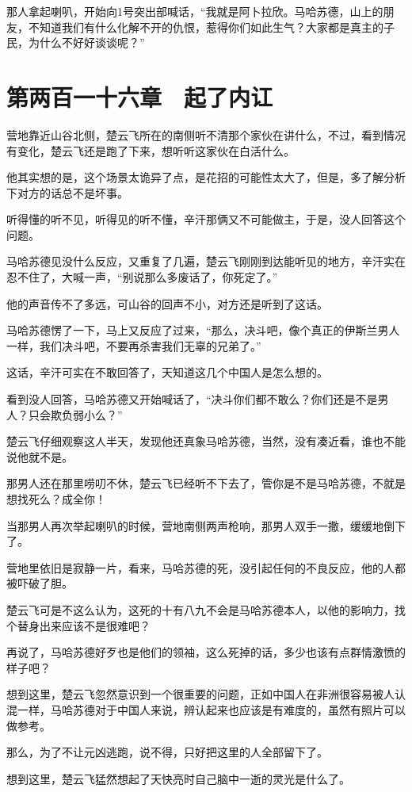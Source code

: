 那人拿起喇叭，开始向1号突出部喊话，“我就是阿卜拉欣。马哈苏德，山上的朋友，不知道我们有什么化解不开的仇恨，惹得你们如此生气？大家都是真主的子民，为什么不好好谈谈呢？”

\section{第两百一十六章　起了内讧}

营地靠近山谷北侧，楚云飞所在的南侧听不清那个家伙在讲什么，不过，看到情况有变化，楚云飞还是跑了下来，想听听这家伙在白活什么。

他其实想的是，这个场景太诡异了点，是花招的可能性太大了，但是，多了解分析下对方的话总不是坏事。

听得懂的听不见，听得见的听不懂，辛汗那俩又不可能做主，于是，没人回答这个问题。

马哈苏德见没什么反应，又重复了几遍，楚云飞刚刚到达能听见的地方，辛汗实在忍不住了，大喊一声，“别说那么多废话了，你死定了。”

他的声音传不了多远，可山谷的回声不小，对方还是听到了这话。

马哈苏德愣了一下，马上又反应了过来，“那么，决斗吧，像个真正的伊斯兰男人一样，我们决斗吧，不要再杀害我们无辜的兄弟了。”

这话，辛汗可实在不敢回答了，天知道这几个中国人是怎么想的。

看到没人回答，马哈苏德又开始喊话了，“决斗你们都不敢么？你们还是不是男人？只会欺负弱小么？”

楚云飞仔细观察这人半天，发现他还真象马哈苏德，当然，没有凑近看，谁也不能说他就不是。

那男人还在那里唠叨不休，楚云飞已经听不下去了，管你是不是马哈苏德，不就是想找死么？成全你！

当那男人再次举起喇叭的时候，营地南侧两声枪响，那男人双手一撒，缓缓地倒下了。

营地里依旧是寂静一片，看来，马哈苏德的死，没引起任何的不良反应，他的人都被吓破了胆。

楚云飞可是不这么认为，这死的十有八九不会是马哈苏德本人，以他的影响力，找个替身出来应该不是很难吧？

再说了，马哈苏德好歹也是他们的领袖，这么死掉的话，多少也该有点群情激愤的样子吧？

想到这里，楚云飞忽然意识到一个很重要的问题，正如中国人在非洲很容易被人认混一样，马哈苏德对于中国人来说，辨认起来也应该是有难度的，虽然有照片可以做参考。

那么，为了不让元凶逃跑，说不得，只好把这里的人全部留下了。

想到这里，楚云飞猛然想起了天快亮时自己脑中一逝的灵光是什么了。

